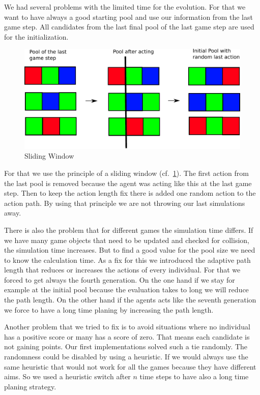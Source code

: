 We had several problems with the limited time for the evolution.
For that we want to have always a good starting pool and use our information from the last
game step. All candidates from the last final pool of the last game step are used for the initialization.


\begin{figure}[H]
\centering
\includegraphics[scale=0.6]{images/sliding_window.pdf}
\caption{Sliding Window}
\label{fig:sliding_window}
\end{figure}

For that we use the principle of a sliding window (cf.~\cref{fig:sliding_window}). The first
action from the last pool is removed because the agent was acting like this at the last game step. Then
to keep the action length fix there is added one random action to the action path.
By using that principle we are not throwing our last simulations away.

There is also the problem that for different games the simulation time differs. If we have many game objects that 
need to be updated and checked for collision, the simulation time increases.
But to find a good value for the pool size we need to know the calculation time.
As a fix for this we introduced the adaptive path length that reduces or increases the actions
of every individual.
For that we forced to get always the fourth generation. On the one hand if we stay for example at the initial
pool because the evaluation takes to long we will reduce the path length. On the other hand if the agents acts like 
the seventh generation we force to have a long time planing by increasing the path length.

Another problem that we tried to fix is to avoid situations where no individual has a positive score or many has a score of zero. That means each 
candidate is not gaining points. Our first implementations solved such a tie randomly. 
The randomness could be disabled by using a heuristic. If we would always use the same heuristic that would not work
for all the games because they have different aims. 
So we used a heuristic switch after $n$ time steps to have also a long time planing strategy.


